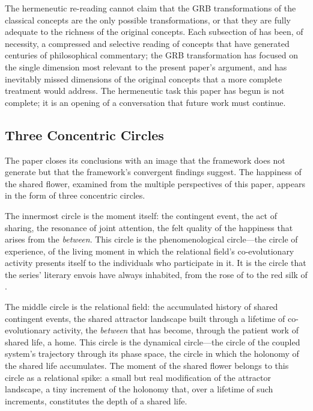 The hermeneutic re-reading cannot claim that the GRB transformations of the classical concepts are the only possible transformations, or that they are fully adequate to the richness of the original concepts. Each subsection of  has been, of necessity, a compressed and selective reading of concepts that have generated centuries of philosophical commentary; the GRB transformation has focused on the single dimension most relevant to the present paper's argument, and has inevitably missed dimensions of the original concepts that a more complete treatment would address. The hermeneutic task this paper has begun is not complete; it is an opening of a conversation that future work must continue.

\subsection{Three Concentric Circles}
\label{p14:subsec:circles}

\noindent
The paper closes its conclusions with an image that the framework does not generate but that the framework's convergent findings suggest. The happiness of the shared flower, examined from the multiple perspectives of this paper, appears in the form of three concentric circles.

The innermost circle is the moment itself: the contingent event, the act of sharing, the resonance of joint attention, the felt quality of the happiness that arises from the \emph{between}. This circle is the phenomenological circle---the circle of experience, of the living moment in which the relational field's co-evolutionary activity presents itself to the individuals who participate in it. It is the circle that the series' literary envois have always inhabited, from the rose of  to the red silk of  \parencite{paperix,paperxiii}.

The middle circle is the relational field: the accumulated history of shared contingent events, the shared attractor landscape built through a lifetime of co-evolutionary activity, the \emph{between} that has become, through the patient work of shared life, a home. This circle is the dynamical circle---the circle of the coupled system's trajectory through its phase space, the circle in which the holonomy of the shared life accumulates. The moment of the shared flower belongs to this circle as a relational spike: a small but real modification of the attractor landscape, a tiny increment of the holonomy that, over a lifetime of such increments, constitutes the depth of a shared life.

